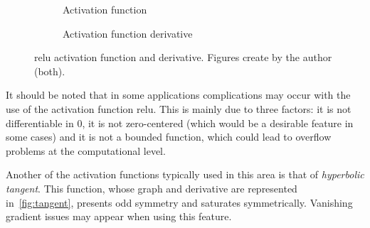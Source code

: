 \begin{figure}[ht]
  \centering
  \begin{subfigure}[b]{.375\textwidth}
    \centering
    \caption{Activation function}
  \end{subfigure}\hspace{3em}
  \begin{subfigure}[b]{.375\textwidth}
    \centering
    \caption{Activation function derivative}
  \end{subfigure}
  \caption[ activation function]{\Acf{relu} activation
    function and derivative. Figures create by the author (both).}%
  \label{fig:relu}
\end{figure}

It should be noted that in some applications complications may occur with the
use of the activation function \gls{relu}. This is mainly due to three factors:
it is not differentiable in \(0\), it is not zero-centered (which would be a
desirable feature in some cases) and it is not a bounded function, which could
lead to overflow problems at the computational level.

Another of the activation functions typically used in this area is that of
\emph{hyperbolic tangent}. This function, whose graph
and derivative are represented in\ \vref{fig:tangent}, presents odd symmetry
and saturates symmetrically. Vanishing gradient issues may appear when using
this feature.

